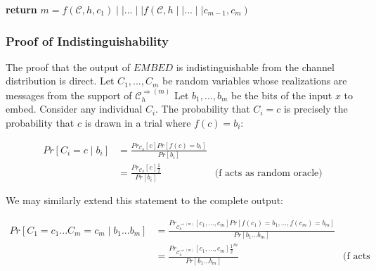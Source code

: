 \documentclass{article}
\begin{document}
\begin{algorithm}[H]
\end{algorithm}

\begin{algorithm}[H]
\begin{algorithmic}[1]
\State \textbf{return} $m = f(,h,c_1) \mid \mid ... \mid \mid f(,h\mid\mid ... \mid\mid c_{m-1}, c_m)$
\EndProcedure
\end{algorithmic}
\end{algorithm}

\subsubsection{Proof of Indistinguishability}

The proof that the output of $EMBED$ is indistinguishable from the channel distribution is direct.  Let $C_1,...,C_m$ be random variables
whose realizations are messages from the support of $_h^{\Rightarrow(m)}$  Let $b_1,...,b_m$ be the bits of the input $x$ to embed.  
Consider any individual $C_i$.  The probability that $C_i = c$ is precisely the probability that $c$ is drawn in a trial where $f(c)=b_i$:

\begin{align*}
Pr[C_i = c \mid b_i ] &= \frac{Pr_{\mathcal{C}_h}[c] Pr[f(c) = b_i]}{Pr[b_i]} \\
&= \frac{Pr_{\mathcal{C}_h}[c] \frac{1}{2}}{Pr[b_i]} & \text{(f acts as random oracle)} 
\end{align*}

We may similarly extend this statement to the complete output: 

\begin{align*}
Pr[C_1 = c_1 ... C_m = c_m \mid b_1 ... b_m] &= \frac{Pr_{\mathcal{C}_h^{\Rightarrow(m)}}[c_1,...,c_m] Pr[f(c_1) = b_1,...,f(c_m)=b_m]}{Pr[b_1...b_m]} \\
&= \frac{Pr_{\mathcal{C}_h^{\Rightarrow(m)}}[c_1,...,c_m] \frac{1}{2}^{m}}{Pr[b_1...b_m]} & \text{(f acts as random oracle)} 
\end{align*}
\end{document}
